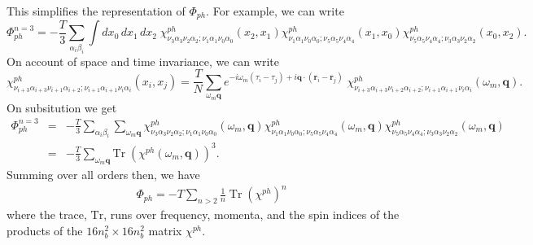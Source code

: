 This simplifies the representation of $\Phi_{ph}$.  For
example, we can write
\begin{equation}
\nonumber
\Phi_{ph}^{n=3} = - \frac{T}{3}
\sum_{\alpha_i \beta_i}
\int dx_0 \,dx_1 \, dx_2 \;
\chi^{ph}_{\nu_3\alpha_3 \nu_2\alpha_2; \nu_1 \alpha_1 \nu_0\alpha_0}(x_2,x_1)
\chi^{ph}_{\nu_1\alpha_1 \nu_0 \alpha_0; \nu_5 \alpha_5 \nu_4 \alpha_4 }(x_1,x_0)
\chi^{ph}_{\nu_5 \alpha_5 \nu_4 \alpha_4; \nu_3 \alpha_3 \nu_2 \alpha_2}(x_0,x_2).
\end{equation}
On account of space and time invariance, we can write
\begin{equation}
\chi^{ph}_{\nu_{i+3}\alpha_{i+3}\nu_{i+1}\alpha_{i+2}; 
\nu_{i+1}\alpha_{i+1}\nu_i \alpha_i}(x_i, x_j) =
\frac{T}{N} \sum_{\omega_m \mathbf{q}}
e^{-i \omega_m(\tau_i - \tau_j) + 
i \mathbf{q}\cdot(\mathbf{r}_i - \mathbf{r}_j)} \;
\chi^{ph}_{\nu_{i+3}\alpha_{i+3}\nu_{i+2}\alpha_{i+2};
\nu_{i+1}\alpha_{i+1}\nu_i \alpha_i}(\omega_m,\mathbf{q}).
\end{equation}
On subsitution we get
\begin{eqnarray}
\Phi_{ph}^{n=3} & = & - \frac{T}{3}
\sum_{\alpha_i \beta_i}
\sum_{\omega_m \mathbf{q}}
\chi^{ph}_{\nu_3\alpha_3 \nu_2 \alpha_2;\nu_1 \alpha_1\nu_0\alpha_0}(\omega_m, \mathbf{q})
\chi^{ph}_{\nu_1\alpha_1 \nu_0 \alpha_0; \nu_5\alpha_5 \nu_4\alpha_4}(\omega_m, \mathbf{q})
\chi^{ph}_{\nu_5\alpha_5\nu_4\alpha_4;\nu_3 \alpha_3 \nu_2\alpha_2}(\omega_m, \mathbf{q})
\\
& = & - \frac{T}{3} \sum_{\omega_m \mathbf{q}} 
\mathrm{Tr} \; (\chi^{ph}(\omega_m, \mathbf{q}))^3.
\end{eqnarray}
Summing over all orders then,  we have
\begin{eqnarray}
\Phi_{ph} = -T \sum_{n > 2} \frac{1}{n}
\; \mathrm{Tr} \; (\chi^{ph})^n
\end{eqnarray}
where the trace, $\mathrm{Tr}$, runs over frequency, momenta,
and the spin indices of the products of the $16 n_b^2 \times 16 n_b^2$
matrix $\chi^{ph}$.

